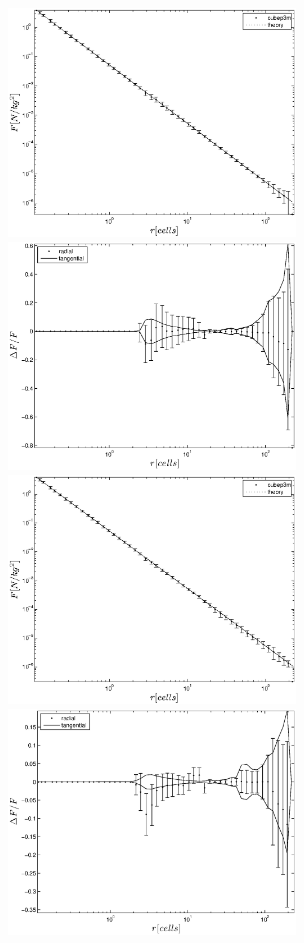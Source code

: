 \documentclass[useAMS,usenatbib]{mn2e}
\begin{document}
 \begin{figure}%
  \begin{center}
    \includegraphics[width=3.0in]{graphs/densityForce_ppext=2_rebin_new-1.eps}
    \includegraphics[width=3.0in]{graphs/DeltaF_pp2.eps}
     \includegraphics[width=3.0in]{graphs/densityForce_ppext=2_rebin_N10_new-1.eps}
    \includegraphics[width=3.0in]{graphs/DeltaF_pp2_N10.eps}

\end{center}
\end{figure}
\end{document}
